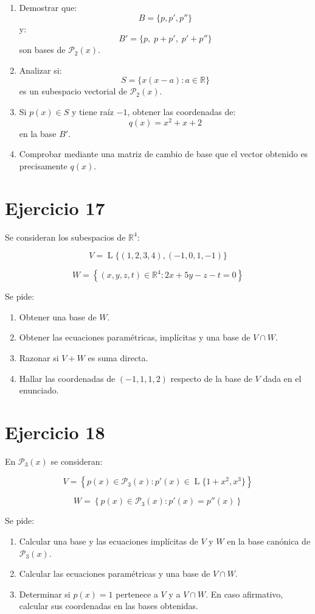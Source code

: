 \documentclass[11pt,a4paper]{article}
\newcommand{\R}{\mathbb{R}}
\newcommand{\Pn}{\mathcal{P}}
\newcommand{\Span}{\operatorname{L}}
\begin{document}
\begin{enumerate}[label=\alph*)]
	\item Demostrar que:
	\[
	B=\{p,p',p''\}
	\]
	y:
	\[
	B'=\{p,\;p+p',\;p'+p''\}
	\]
	son bases de $\Pn_2(x)$.
	\item Analizar si:
	\[
	S=
	\{x(x-a):a\in\R\}
	\]
	es un subespacio vectorial de $\Pn_2(x)$.
	\item Si $p(x)\in S$ y tiene raíz $-1$, obtener las coordenadas de:
	\[
	q(x)=x^2+x+2
	\]
	en la base $B'$.
	\item Comprobar mediante una matriz de cambio de base que el vector obtenido es precisamente $q(x)$.
\end{enumerate}

\section{Ejercicio 17}
Se consideran los subespacios de $\R^4$:

\[
V=
\Span\{(1,2,3,4),(-1,0,1,-1)\}
\]

\[
W=
\left\{
(x,y,z,t)\in\R^4:
2x+5y-z-t=0
\right\}
\]

Se pide:

\begin{enumerate}[label=\alph*)]
	\item Obtener una base de $W$.
	\item Obtener las ecuaciones paramétricas, implícitas y una base de $V\cap W$.
	\item Razonar si $V+W$ es suma directa.
	\item Hallar las coordenadas de $(-1,1,1,2)$ respecto de la base de $V$ dada en el enunciado.
\end{enumerate}

\section{Ejercicio 18}
En $\Pn_3(x)$ se consideran:

\[
V=
\left\{
p(x)\in\Pn_3(x):
p'(x)\in
\Span\{1+x^2,x^3\}
\right\}
\]

\[
W=
\left\{
p(x)\in\Pn_3(x):
p'(x)=p''(x)
\right\}
\]

Se pide:

\begin{enumerate}[label=\alph*)]
	\item Calcular una base y las ecuaciones implícitas de $V$ y $W$ en la base canónica de $\Pn_3(x)$.
	\item Calcular las ecuaciones paramétricas y una base de $V\cap W$.
	\item Determinar si $p(x)=1$ pertenece a $V$ y a $V\cap W$. En caso afirmativo, calcular sus coordenadas en las bases obtenidas.
\end{enumerate}
\end{document}
